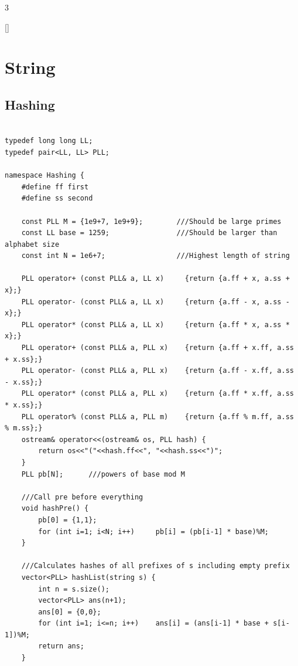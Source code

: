 \documentclass[twoside]{article}
\begin{document}
\begin{multicols*}{3}
{
[\vspace{2em}]
\section*{String}
}
{
\subsection*{Hashing}
}
\begin{verbatim}

typedef long long LL;
typedef pair<LL, LL> PLL;

namespace Hashing {
    #define ff first
    #define ss second

    const PLL M = {1e9+7, 1e9+9};        ///Should be large primes
    const LL base = 1259;                ///Should be larger than alphabet size
    const int N = 1e6+7;                 ///Highest length of string

    PLL operator+ (const PLL& a, LL x)     {return {a.ff + x, a.ss + x};}
    PLL operator- (const PLL& a, LL x)     {return {a.ff - x, a.ss - x};}
    PLL operator* (const PLL& a, LL x)     {return {a.ff * x, a.ss * x};}
    PLL operator+ (const PLL& a, PLL x)    {return {a.ff + x.ff, a.ss + x.ss};}
    PLL operator- (const PLL& a, PLL x)    {return {a.ff - x.ff, a.ss - x.ss};}
    PLL operator* (const PLL& a, PLL x)    {return {a.ff * x.ff, a.ss * x.ss};}
    PLL operator% (const PLL& a, PLL m)    {return {a.ff % m.ff, a.ss % m.ss};}
    ostream& operator<<(ostream& os, PLL hash) {
        return os<<"("<<hash.ff<<", "<<hash.ss<<")";
    }
    PLL pb[N];      ///powers of base mod M

    ///Call pre before everything
    void hashPre() {
        pb[0] = {1,1};
        for (int i=1; i<N; i++)     pb[i] = (pb[i-1] * base)%M;
    }

    ///Calculates hashes of all prefixes of s including empty prefix
    vector<PLL> hashList(string s) {
        int n = s.size();
        vector<PLL> ans(n+1);
        ans[0] = {0,0};
        for (int i=1; i<=n; i++)    ans[i] = (ans[i-1] * base + s[i-1])%M;
        return ans;
    }


\end{verbatim}
\end{multicols*}
\end{document}
